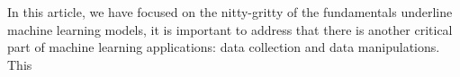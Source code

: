In this article, we have focused on the nitty-gritty of the fundamentals underline machine learning models, it is important to address that there is another critical part of machine learning applications: data collection and data manipulations. This  